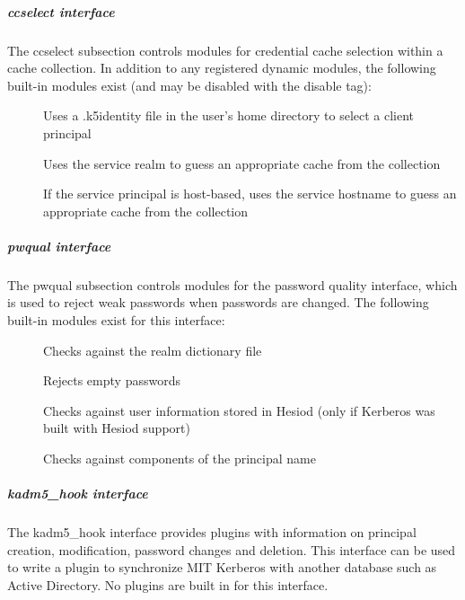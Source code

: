 \documentclass[letterpaper,10pt,english]{sphinxmanual}
\begin{document}
\subparagraph{ccselect interface}
\label{\detokenize{admin/conf_files/krb5_conf:ccselect}}\label{\detokenize{admin/conf_files/krb5_conf:ccselect-interface}}
The ccselect subsection controls modules for credential cache
selection within a cache collection.  In addition to any registered
dynamic modules, the following built-in modules exist (and may be
disabled with the disable tag):
\begin{description}
\item[{}] \leavevmode
Uses a .k5identity file in the user’s home directory to select a
client principal

\item[{}] \leavevmode
Uses the service realm to guess an appropriate cache from the
collection

\item[{}] \leavevmode
If the service principal is host-based, uses the service hostname
to guess an appropriate cache from the collection

\end{description}


\subparagraph{pwqual interface}
\label{\detokenize{admin/conf_files/krb5_conf:pwqual-interface}}\label{\detokenize{admin/conf_files/krb5_conf:pwqual}}
The pwqual subsection controls modules for the password quality
interface, which is used to reject weak passwords when passwords are
changed.  The following built-in modules exist for this interface:
\begin{description}
\item[{}] \leavevmode
Checks against the realm dictionary file

\item[{}] \leavevmode
Rejects empty passwords

\item[{}] \leavevmode
Checks against user information stored in Hesiod (only if Kerberos
was built with Hesiod support)

\item[{}] \leavevmode
Checks against components of the principal name

\end{description}


\subparagraph{kadm5\_hook interface}
\label{\detokenize{admin/conf_files/krb5_conf:kadm5-hook-interface}}\label{\detokenize{admin/conf_files/krb5_conf:kadm5-hook}}
The kadm5\_hook interface provides plugins with information on
principal creation, modification, password changes and deletion.  This
interface can be used to write a plugin to synchronize MIT Kerberos
with another database such as Active Directory.  No plugins are built
in for this interface.
\end{document}
